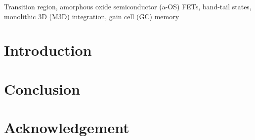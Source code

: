 \documentclass[journal,twoside,web]{ieeecolor}
\begin{document}
\begin{IEEEkeywords}
Transition region, amorphous oxide semiconductor (a-OS) FETs, band-tail states, monolithic 3D (M3D) integration, gain cell (GC) memory
\end{IEEEkeywords}

\section{Introduction}
\label{sec:introduction}
\section{Conclusion}
\label{sec:conclusion}
\section*{Acknowledgement}


\end{document}
